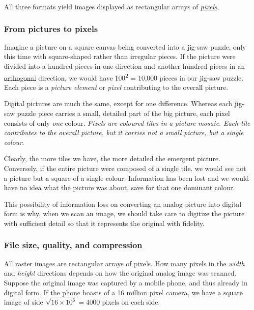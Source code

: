 \documentclass[
  a4paper,
]{article}
\begin{document}
All three formats yield images displayed as rectangular arrays of
\href{https://en.wikipedia.org/wiki/Pixels}{\emph{pixels}}.

\hypertarget{from-pictures-to-pixels}{%
\subsubsection{From pictures to pixels}\label{from-pictures-to-pixels}}

Imagine a picture on a square canvas being converted into a jig-saw
puzzle, only this time with square-shaped rather than irregular pieces.
If the picture were divided into a hundred pieces in one direction and
another hundred pieces in an
\href{https://en.wikipedia.org/wiki/Orthogonality}{orthogonal}
direction, we would have 100\textsuperscript{2} = 10,000 pieces in our
jig-saw puzzle. Each piece is a \emph{picture element} or \emph{pixel}
contributing to the overall picture.

Digital pictures are much the same, except for one difference. Whereas
each jig-saw puzzle piece carries a small, detailed part of the big
picture, each pixel consists of only \emph{one} colour. \emph{Pixels are
coloured tiles in a picture mosaic. Each tile contributes to the overall
picture, but it carries not a small picture, but a single colour}.

Clearly, the more tiles we have, the more detailed the emergent picture.
Conversely, if the entire picture were composed of a single tile, we
would see not a picture but a square of a single colour. Information has
been lost and we would have no idea what the picture was about, save for
that one dominant colour.

This possibility of information loss on converting an analog picture
into digital form is why, when we scan an image, we should take care to
digitize the picture with sufficient detail so that it represents the
original with fidelity.

\hypertarget{file-size-quality-and-compression}{%
\subsubsection{File size, quality, and
compression}\label{file-size-quality-and-compression}}

All raster images are rectangular arrays of pixels. How many pixels in
the \emph{width} and \emph{height} directions depends on how the
original analog image was scanned. Suppose the original image was
captured by a mobile phone, and thus already in digital form. If the
phone boasts of a 16 million pixel camera, we have a square image of
side \(\sqrt{16\times 10^6} = 4000\) pixels on each side.
\end{document}
